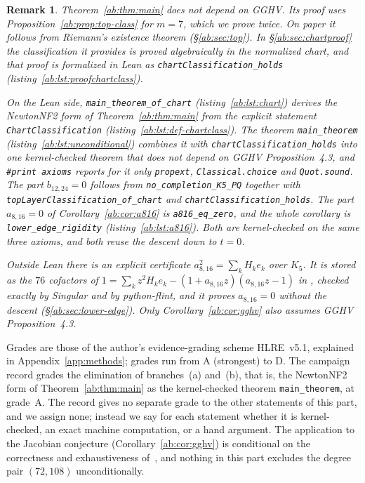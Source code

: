 \documentclass[a4paper,11pt]{article}
\newcommand{\filename}[1]{\texttt{\seqsplit{#1}}}
\theoremstyle{jsplain}
\theoremstyle{jsdef}
\theoremstyle{jsrem}
\newtheorem{remark}[theorem]{Remark}
\begin{document}
\begin{remark}\label{ab:rem:conditional}
Theorem~\ref{ab:thm:main} does not depend on GGHV. Its proof uses Proposition~\ref{ab:prop:top-class} for $m=7$, which we prove twice. On paper it follows from Riemann's existence theorem (\S\ref{ab:sec:top}). In \S\ref{ab:sec:chartproof} the classification it provides is proved algebraically in the normalized chart, and that proof is formalized in Lean as \texttt{chartClassification\_\allowbreak{}holds} (listing~\ref{ab:lst:proofchartclass}).

On the Lean side, \texttt{main\_\allowbreak{}theorem\_\allowbreak{}of\_\allowbreak{}chart} (listing~\ref{ab:lst:chart}) derives the NewtonNF2 form of Theorem~\ref{ab:thm:main} from the explicit statement \texttt{ChartClassification} (listing~\ref{ab:lst:def-chartclass}). The theorem \texttt{main\_\allowbreak{}theorem} (listing~\ref{ab:lst:unconditional}) combines it with \texttt{chartClassification\_\allowbreak{}holds} into one kernel-checked theorem that does not depend on GGHV Proposition~4.3, and \texttt{\#print axioms} reports for it only \texttt{propext}, \texttt{Classical.\allowbreak{}choice} and \texttt{Quot.\allowbreak{}sound}. The part $b_{12,24}=0$ follows from \texttt{no\_\allowbreak{}completion\_\allowbreak{}K5\_\allowbreak{}PQ} together with \texttt{topLayerClassification\_\allowbreak{}of\_\allowbreak{}chart} and \texttt{chartClassification\_\allowbreak{}holds}. The part $a_{8,16}=0$ of Corollary~\ref{ab:cor:a816} is \texttt{a816\_\allowbreak{}eq\_\allowbreak{}zero}, and the whole corollary is \texttt{lower\_\allowbreak{}edge\_\allowbreak{}rigidity} (listing~\ref{ab:lst:a816}). Both are kernel-checked on the same three axioms, and both reuse the descent down to $t=0$.

Outside Lean there is an explicit certificate $a_{8,16}^2=\sum_k H_k e_k$ over $K_5$. It is stored as the $76$ cofactors of $1=\sum_k z^2H_k e_k-(1+a_{8,16}z)(a_{8,16}z-1)$ in \filename{scripts/a816\_certificate/a816\_lift.txt}, checked exactly by {\sc Singular} and by python-flint, and it proves $a_{8,16}=0$ without the descent (\S\ref{ab:sec:lower-edge}). Only Corollary~\ref{ab:cor:gghv} also assumes GGHV Proposition~4.3.
\end{remark}

Grades are those of the author's evidence-grading scheme HLRE~v5.1, explained in Appendix~\ref{app:methods}; grades run from A (strongest) to D. The campaign record grades the elimination of branches~(a) and~(b), that is, the NewtonNF2 form of Theorem~\ref{ab:thm:main} as the kernel-checked theorem \texttt{main\_\allowbreak{}theorem}, at grade~A. The record gives no separate grade to the other statements of this part, and we assign none; instead we say for each statement whether it is kernel-checked, an exact machine computation, or a hand argument. The application to the Jacobian conjecture (Corollary~\ref{ab:cor:gghv}) is conditional on the correctness and exhaustiveness of~\cite[Prop.~4.3]{GGHV}, and nothing in this part excludes the degree pair $(72,108)$ unconditionally.
\end{document}
